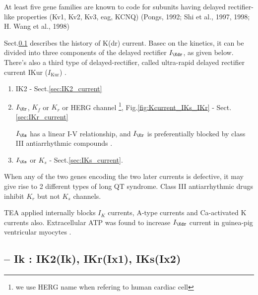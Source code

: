 At least five gene families are known to code for subunits having delayed
rectifier-like properties (Kv1, Kv2, Kv3, eag, KCNQ) (Pongs, 1992; Shi et al.,
1997, 1998; H. Wang et al., 1998)

Sect.\ref{sec:Ik_HodgkinHuxley-axon} describes the history of K(dr) current.
Basec on the kinetics, it can be divided into three components of the delayed
rectifier $I_\Kdr$, as given below.
There's also a third type of delayed-rectifier, called ultra-rapid delayed
rectifier current IKur ($I_\text{Kur}$) \citep{li1996}.

\begin{enumerate}

  \item IK2 - Sect.\ref{sec:IK2_current}
      
  \item $I_\Kr$, $K_f$ or $K_r$ or HERG channel \footnote{we use HERG
  name when refering to human cardiac cell}, Fig.\ref{fig:Kcurrent_IKs_IKr} -
  Sect.\ref{sec:IKr_current}
  
  $I_\Ks$ has a linear I-V relationship, and $I_\Kr$ is preferentially blocked
  by class III antiarrhythmic compounds \citep{sanguinetti1997}.

  \item $I_\Ks$ or $K_s$ - Sect.\ref{sec:IKs_current}.


\end{enumerate}
When any of the two genes encoding the two later currents is defective, it may
give rise to 2 different types of long QT syndrome. 
Class III antiarrhythmic drugs inhibit $K_r$ but not $K_s$ channels. 

TEA applied internally blocks $I_K$ currents, A-type currents and Ca-activated K
currents also. Extracellular ATP was found to increase $I_\Kdr$ current in
guinea-pig ventricular myocytes \citep{matsubayashi1999}.


\subsection{-- Ik : IK2(Ik), IKr(Ix1), IKs(Ix2)}
\label{sec:Ik_HodgkinHuxley-axon}
\label{sec:IK2_Purkinje-fiber}
\label{sec:IKx1_Purkinje-fiber}
\label{sec:IKr_Purkinje-fiber}
\label{sec:IKs_Purkinje-fiber}
\label{sec:IKx2_Purkinje-fiber}


